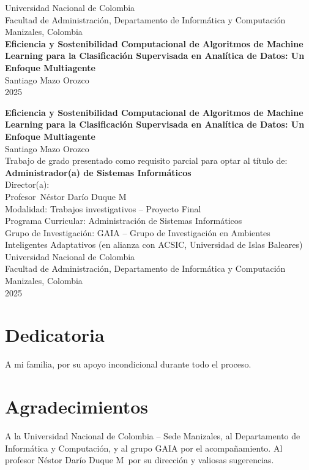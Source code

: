 \documentclass[12pt,oneside]{report}
\newcommand{\Titulo}{Eficiencia y Sostenibilidad Computacional de Algoritmos de Machine Learning para la Clasificación Supervisada en Analítica de Datos: Un Enfoque Multiagente}
\newcommand{\Autor}{Santiago Mazo Orozco}
\newcommand{\Universidad}{Universidad Nacional de Colombia}
\newcommand{\Facultad}{Facultad de Administración, Departamento de Informática y Computación}
\newcommand{\Ciudad}{Manizales, Colombia}
\newcommand{\Anio}{2025}
\newcommand{\Grado}{Administrador(a) de Sistemas Informáticos}
\newcommand{\Programa}{Administración de Sistemas Informáticos}
\newcommand{\DirectorTitulo}{Profesor}
\newcommand{\DirectorNombre}{Néstor Darío Duque M}
\newcommand{\Modalidad}{Trabajos investigativos – Proyecto Final}
\newcommand{\Grupo}{GAIA – Grupo de Investigación en Ambientes Inteligentes Adaptativos (en alianza con ACSIC, Universidad de Islas Baleares)}
\begin{document}
\begin{titlepage}
    \centering
    {\Large \Universidad \\[0.25cm] \Facultad \\\Ciudad \\[1.5cm]}
    {\LARGE \bfseries \Titulo \\[1.8cm]}
    {\Large \Autor \\[2.0cm]}
    {\Large \Anio}
\end{titlepage}

\begin{titlepage}
    \centering
    {\LARGE \bfseries \Titulo \\[1.2cm]}
    {\Large \Autor \\[1.2cm]}
    {Trabajo de grado presentado como requisito parcial para optar al título de: \\[0.2cm]
    \textbf{\Grado} \\[0.8cm]}
    {Director(a): \\[0.1cm] \DirectorTitulo~\DirectorNombre \\[0.8cm]}
    {Modalidad: \Modalidad \\[0.2cm]}
    {Programa Curricular: \Programa \\[0.2cm]}
    {Grupo de Investigación: \Grupo \\[1.2cm]}
    {\Universidad \\ \Facultad \\ \Ciudad \\[0.8cm]}
    {\Anio}
\end{titlepage}


\chapter*{Dedicatoria}
A mi familia, por su apoyo incondicional durante todo el proceso.

\chapter*{Agradecimientos}
A la Universidad Nacional de Colombia – Sede Manizales, al Departamento de Informática y Computación, y al grupo GAIA por el acompañamiento. Al profesor \DirectorNombre~por su dirección y valiosas sugerencias.
\end{document}
